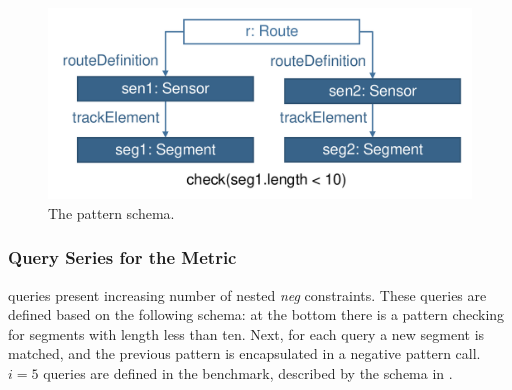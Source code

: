 \begin{figure}[Htb]
\begin{center}
    \includegraphics[scale=0.4]{figures/checks.pdf}
    \caption{The  pattern schema.}
    \label{fig:asechecks}
\end{center}
\end{figure}


\subsubsection{ Query Series for the  Metric}
 queries present increasing number of nested \emph{neg} constraints.
These queries are defined based on the following schema: at the bottom there is
a pattern checking for segments with length less than ten. Next, for each query
a new segment is matched, and the previous pattern is encapsulated in a negative
pattern call. $i=5$ queries are defined in the benchmark, described by the
schema in .

